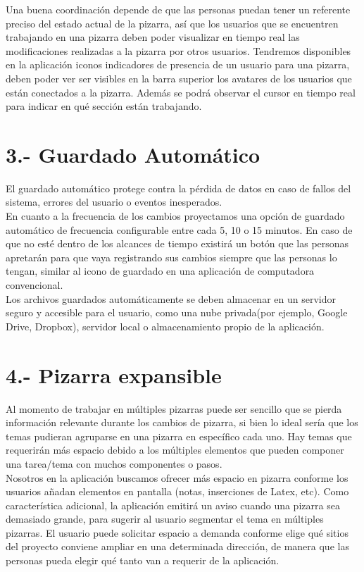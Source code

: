 \documentclass[a4paper, oneside, final]{scrartcl}
\begin{document}
Una buena coordinación depende de que las personas puedan tener un referente preciso del estado actual de la pizarra, así que los usuarios que se encuentren trabajando en una pizarra deben poder visualizar en tiempo real las modificaciones realizadas a la pizarra por otros usuarios. Tendremos disponibles en la aplicación iconos indicadores de presencia de un usuario para una pizarra, deben poder ver ser visibles en la barra superior los avatares de los usuarios que están conectados a la pizarra. Además se podrá observar el cursor en tiempo real para indicar en qué sección están trabajando.


\noindent
\section{3.- Guardado Automático} %

  El guardado automático protege contra la pérdida de datos en caso de fallos del sistema, errores del usuario o eventos inesperados.\\
  En cuanto a la frecuencia de los cambios proyectamos una opción de guardado automático de frecuencia configurable entre cada 5, 10 o 15 minutos. En caso de que no esté dentro de los alcances de tiempo existirá un botón que las personas apretarán para que vaya registrando sus cambios siempre que las personas lo tengan, similar al icono de guardado en una aplicación de computadora convencional.\\
    
Los archivos guardados automáticamente se deben almacenar en un servidor seguro y accesible para el usuario, como una nube privada(por ejemplo, Google Drive, Dropbox), servidor local o almacenamiento propio de la aplicación.\\

\section{4.- Pizarra expansible}%

 Al momento de trabajar en múltiples pizarras puede ser sencillo que se pierda información relevante durante los cambios de pizarra, si bien lo ideal sería que los temas pudieran agruparse en una pizarra en específico cada uno. Hay temas que requerirán más espacio debido a los múltiples elementos que pueden componer una tarea/tema con muchos componentes o pasos.\\

  Nosotros en la aplicación buscamos ofrecer más espacio en pizarra conforme los usuarios añadan elementos en pantalla (notas, inserciones de Latex, etc). Como característica adicional, la aplicación emitirá un aviso cuando una pizarra sea demasiado grande, para sugerir al usuario segmentar el tema en múltiples pizarras. El usuario puede solicitar espacio a demanda conforme elige qué sitios del proyecto conviene ampliar en una determinada dirección, de manera que las personas pueda elegir qué tanto van a requerir de la aplicación.
\end{document}

